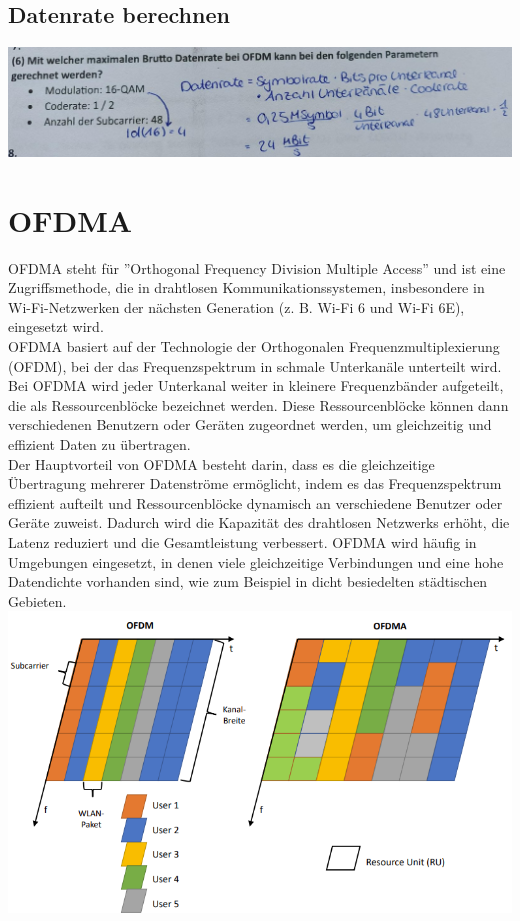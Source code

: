 \documentclass[12pt,a4paper]{article}
\begin{document}
	\subsection{Datenrate berechnen}
		\includegraphics[width=\textwidth]{Bilder/datenrate_berechnen.jpg}

\section{OFDMA}
	OFDMA steht für ''Orthogonal Frequency Division Multiple Access'' und ist eine Zugriffsmethode, die in drahtlosen Kommunikationssystemen, insbesondere in Wi-Fi-Netzwerken der nächsten Generation (z. B. Wi-Fi 6 und Wi-Fi 6E), eingesetzt wird.\\
	OFDMA basiert auf der Technologie der Orthogonalen Frequenzmultiplexierung (OFDM), bei der das Frequenzspektrum in schmale Unterkanäle unterteilt wird. Bei OFDMA wird jeder Unterkanal weiter in kleinere Frequenzbänder aufgeteilt, die als Ressourcenblöcke bezeichnet werden. Diese Ressourcenblöcke können dann verschiedenen Benutzern oder Geräten zugeordnet werden, um gleichzeitig und effizient Daten zu übertragen.\\
	Der Hauptvorteil von OFDMA besteht darin, dass es die gleichzeitige Übertragung mehrerer Datenströme ermöglicht, indem es das Frequenzspektrum effizient aufteilt und Ressourcenblöcke dynamisch an verschiedene Benutzer oder Geräte zuweist. Dadurch wird die Kapazität des drahtlosen Netzwerks erhöht, die Latenz reduziert und die Gesamtleistung verbessert. OFDMA wird häufig in Umgebungen eingesetzt, in denen viele gleichzeitige Verbindungen und eine hohe Datendichte vorhanden sind, wie zum Beispiel in dicht besiedelten städtischen Gebieten.\\
	\includegraphics[width=\textwidth]{Bilder/ofdma.PNG}
\end{document}
